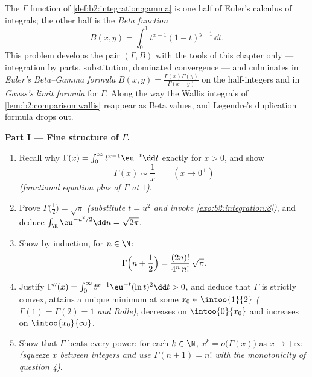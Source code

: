 \begin{problem}\label{pb:b2:integration:1}
The $\Gamma$ function of \cref{def:b2:integration:gamma} is one
half of Euler's calculus of integrals; the other half is the
\emph{Beta function}
\[
B(x, y) = \int_0^1 t^{x-1}(1 - t)^{y-1}\,\dd t .
\]
This problem develops the pair $(\Gamma, B)$ with the tools of
this chapter only --- integration by parts, substitution,
dominated convergence --- and culminates in \emph{Euler's
Beta--Gamma formula} $B(x,y) = \frac{\Gamma(x)\Gamma(y)}
{\Gamma(x+y)}$ on the half-integers and in \emph{Gauss's limit
formula} for $\Gamma$. Along the way
the Wallis integrals of \cref{lem:b2:comparison:wallis} reappear
as Beta values, and Legendre's duplication formula drops out.

\medskip
\noindent\textbf{Part I --- Fine structure of $\Gamma$.}
\begin{enumerate}
  \item Recall why $\Gamma(x) = \int_0^\infty t^{x-1}\eu^{-t}\dd
        t$  exactly for $x > 0$, and show
        \[
        \Gamma(x) \sim \frac1x \qquad (x \to 0^+)
        \]
        \emph{(functional equation plus  of $\Gamma$ at
        $1$)}.
  \item Prove $\Gamma\bigl(\tfrac12\bigr) = \sqrt\pi$
        \emph{(substitute $t = u^2$ and invoke
        \cref{exo:b2:integration:8})}, and deduce
        $\int_\R \eu^{-u^2/2}\dd u = \sqrt{2\pi}$.
  \item Show by induction, for $n \in \N$:
        \[
        \Gamma\Bigl(n + \frac12\Bigr)
        = \frac{(2n)!}{4^n\,n!}\,\sqrt\pi .
        \]
  \item Justify $\Gamma''(x) = \int_0^\infty
        t^{x-1}\eu^{-t}(\ln t)^2\dd t > 0$, and deduce that
        $\Gamma$ is strictly convex, attains a unique minimum at
        some $x_0 \in \intoo{1}{2}$ \emph{($\Gamma(1) = \Gamma(2)
        = 1$ and Rolle)}, decreases on $\intoo{0}{x_0}$ and
        increases on $\intoo{x_0}{\infty}$.
  \item Show that $\Gamma$ beats every power: for each $k \in
        \N$, $x^k = o\bigl(\Gamma(x)\bigr)$ as $x \to +\infty$
        \emph{(squeeze $x$ between integers and use $\Gamma(n+1)
        = n!$ with the monotonicity of question 4)}.
\end{enumerate}


\end{problem}
